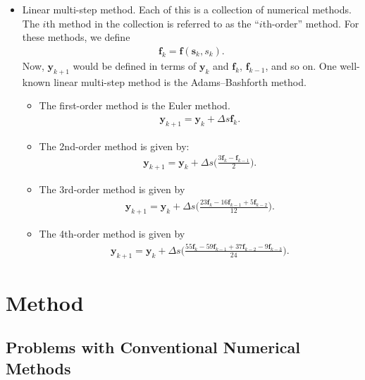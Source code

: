\documentclass[10pt]{article}
\newcommand{\ve}[1]{\mathbf{#1}}
\begin{document}
\begin{itemize}
\begin{itemize}
    \item Linear multi-step method. Each of this is a collection of numerical methods. The $i$th method in the collection is referred to as the ``$i$th-order'' method. For these methods, we define
    \begin{align*}
      \ve{f}_k = \ve{f}(\ve{s}_k, s_k).
    \end{align*}
    Now, $\ve{y}_{k+1}$ would be defined in terms of $\ve{y}_k$ and $\ve{f}_k$, $\ve{f}_{k-1}$, and so on. One well-known linear multi-step method is the Adams--Bashforth method.
    \begin{itemize}
      \item The first-order method is the Euler method. 
      \begin{align*}
        \ve{y}_{k+1} = \ve{y}_k + \Delta s \ve{f}_k.
      \end{align*}
      \item The 2nd-order method is given by:
      \begin{align*}
        \ve{y}_{k+1} = \ve{y}_k + \Delta s \bigg( \frac{3 \ve{f}_k - \ve{f}_{k-1}}{2} \bigg).
      \end{align*}
      \item The 3rd-order method is given by
      \begin{align*}
        \ve{y}_{k+1} = \ve{y}_k + \Delta s \bigg( \frac{23 \ve{f}_k - 16\ve{f}_{k-1} + 5\ve{f}_{k-2}}{12} \bigg).
      \end{align*}
      \item The 4th-order method is given by
      \begin{align*}
        \ve{y}_{k+1} = \ve{y}_k + \Delta s \bigg( \frac{55 \ve{f}_k - 59\ve{f}_{k-1} + 37\ve{f}_{k-2} -9 \ve{f}_{k-3}}{24} \bigg).
      \end{align*}
    \end{itemize}
  \end{itemize}
\end{itemize}

\section{Method}

\subsection{Problems with Conventional Numerical Methods}
\end{document}
